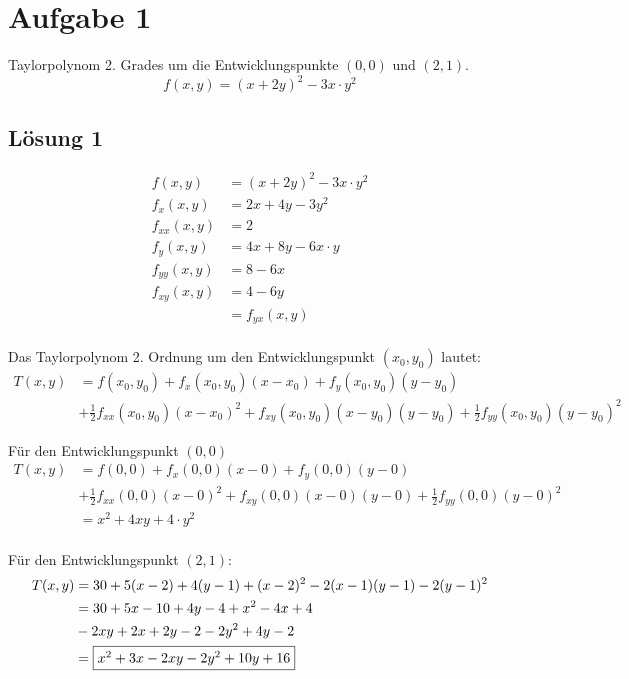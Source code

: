 \documentclass[main.tex]{subfiles}
\begin{document}
\section{Aufgabe 1}
Taylorpolynom 2. Grades um die Entwicklungspunkte $(0,0)$ und $(2,1)$.
\[
    f(x, y) = (x+2y)^2 - 3x\cdot y^2
\]

\subsection{Lösung 1}

\begin{align*}
    f(x, y) &= (x+2y)^2 - 3x\cdot y^2 \\
    f_{x}(x, y) &= 2x +4y - 3y^2 \\
    f_{xx}(x, y) &= 2 \\
    f_{y}(x, y) &= 4x +8y - 6x\cdot y \\
    f_{yy}(x, y) &= 8 - 6x \\
    f_{xy}(x, y) &= 4 - 6y \\
                 &= f_{yx}(x, y) \\
\end{align*}

Das Taylorpolynom 2. Ordnung um den Entwicklungspunkt $(x_0, y_0)$ lautet:
\begin{align*}
    T(x,y) &= f(x_0, y_0) 
    + f_x(x_0, y_0)(x-x_0) 
    + f_y(x_0, y_0)(y-y_0) \\
    &+ \frac{1}{2} f_{xx}(x_0, y_0)(x-x_0)^2
    + f_{xy}(x_0, y_0)(x-y_0)(y-y_0)
    + \frac{1}{2} f_{yy}(x_0, y_0)(y-y_0)^2
\end{align*}

Für den Entwicklungspunkt $(0, 0)$
\begin{align*}
    T(x,y) &= f(0, 0) 
    + f_x(0, 0)(x-0) 
    + f_y(0, 0)(y-0) \\
    &+ \frac{1}{2} f_{xx}(0, 0)(x-0)^2
    + f_{xy}(0, 0)(x-0)(y-0)
    + \frac{1}{2} f_{yy}(0, 0)(y-0)^2 \\[3mm]
    &= x^2
    + 4 xy
    + 4\cdot y^2 \\[3mm]
\end{align*}

Für den Entwicklungspunkt $(2, 1)$:
\begin{align*}
    T(x,y) &= 30
    + 5(x-2) 
    + 4(y-1)
    + (x-2)^2
    -2(x-1)(y-1)
    -2(y-1)^2 \\
    &= 30 + 5x -10 + 4y -4 +x^2 -4x +4 \\
    & -2xy +2x +2y -2 -2y^2 +4y -2 \\
    &= \fbox{$x^2 + 3x -2xy -2y^2 + 10y + 16$}
\end{align*}
\end{document}
